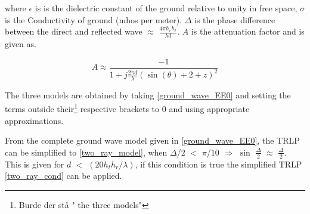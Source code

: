 where $\epsilon$ is is the dielectric constant of the ground relative to
unity in free space, $\sigma$ is the Conductivity of ground (mhos per meter). $\Delta$ is the phase difference between the direct and reflected wave $\approx$ $\frac{4\pi h_{r} h_{t}}{\lambda d}$. $A$ is the attenuation factor and is given as.

\begin{equation}
A \approx \frac{-1}{1+j\frac{2\pi d}{\lambda}(\sin(\theta)+2+z)^{2}}
\label{attenuation_factor_A}
\end{equation}





The three models are obtained by taking \eqref{ground_wave_EE0} and setting the terms outside their\footnote{Burde der stå " the three models"} respective brackets to 0 and using appropriate approximations.

From the complete ground wave model given in \eqref{ground_wave_EE0}, the TRLP can be simplified to \eqref{two_ray_model}, 
when $\Delta$/$2$ $<$ $\pi$/$10$ $\Rightarrow$ $\sin$ $\frac{\Delta}{2}$ $\approx$ $\frac{\Delta}{2}$. This is given for $d$ $<$ $(20h_{t}h_{r}/\lambda)$, if this condition is true the simplified TRLP \eqref{two_ray_cond} can be applied.  
  
  
















